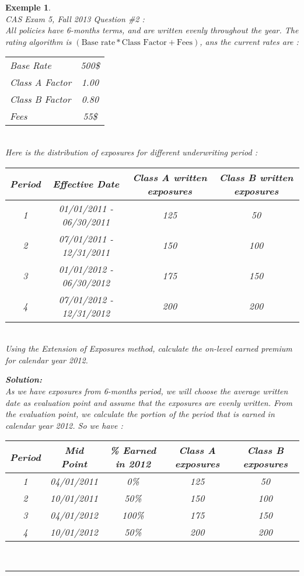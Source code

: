 \documentclass[11pt, english]{memoir}
\numberwithin{definition}{section}
\newtheorem{example}{Exemple}[section]
\newenvironment{exemple}
{
	\begin{example} \normalfont \ \\ 
	}
	{
		\hfill\rule{0.5em}{0.5em}\end{example}
}
\newenvironment{solution}
{\noindent\textbf{Solution:} \\ 
}{
}
\begin{document}
	
	\begin{exemple}
		CAS Exam 5, Fall 2013 Question \#2 :\\
		All policies have 6-months terms, and are written evenly throughout the year. The rating algorithm is $ (\text{Base rate}*\text{Class Factor} + \text{Fees}) $, ans the current rates are :
		
		\begin{tabular}{lc}
			Base Rate & 500\$ \\
			Class A Factor & 1.00 \\
			Class B Factor & 0.80 \\
			Fees & 55\$
		\end{tabular}\\
	
		Here is the distribution of exposures for different underwriting period : 
		
		\begin{tabular}{cccc}
			\toprule
			Period & Effective Date & Class A written exposures & Class B written exposures \\
			\midrule
			1 & 01/01/2011 - 06/30/2011 & 125 & 50 \\
			2 & 07/01/2011 - 12/31/2011 & 150 & 100 \\
			3 & 01/01/2012 - 06/30/2012 & 175 & 150 \\
			4 & 07/01/2012 - 12/31/2012 & 200 & 200 \\
			\bottomrule
		\end{tabular}\\
		
		Using the Extension of Exposures method, calculate the on-level earned premium for calendar year 2012.
		 
		\begin{solution}
			As we have exposures from 6-months period, we will choose the average written date as evaluation point and assume that the exposures are evenly written. From the evaluation point, we calculate the portion of the period that is earned in calendar year 2012. So we have : 
			
			\begin{tabular}{ccccc}
				\toprule
				Period & Mid Point & \% Earned in 2012 & Class A exposures & Class B exposures \\
				\midrule
				1 & 04/01/2011 & 0\% & 125 & 50 \\
				2 & 10/01/2011 & 50\% & 150 & 100 \\
				3 & 04/01/2012 & 100\% & 175 & 150 \\
				4 & 10/01/2012 & 50\% & 200 & 200 \\
				\bottomrule
			\end{tabular}\\
		

\end{solution}
\end{exemple}
\end{document}
